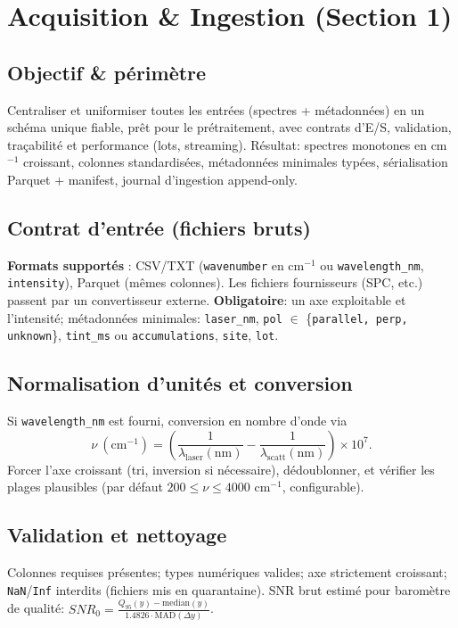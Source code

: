 
\section{Acquisition \& Ingestion (Section 1)}

\subsection{Objectif \& périmètre}
Centraliser et uniformiser toutes les entrées (spectres + métadonnées) en un schéma unique fiable, prêt pour le prétraitement, avec contrats d'E/S, validation, traçabilité et performance (lots, streaming). Résultat: spectres monotones en cm$^{-1}$ croissant, colonnes standardisées, métadonnées minimales typées, sérialisation Parquet + manifest, journal d'ingestion append-only.

\subsection{Contrat d'entrée (fichiers bruts)}
\textbf{Formats supportés} : CSV/TXT (\texttt{wavenumber} en cm$^{-1}$ ou \texttt{wavelength\_nm}, \texttt{intensity}), Parquet (mêmes colonnes). Les fichiers fournisseurs (SPC, etc.) passent par un convertisseur externe.
\textbf{Obligatoire}: un axe exploitable et l'intensité; métadonnées minimales: \texttt{laser\_nm}, \texttt{pol} $\in$ \{\texttt{parallel, perp, unknown}\}, \texttt{tint\_ms} ou \texttt{accumulations}, \texttt{site}, \texttt{lot}.

\subsection{Normalisation d'unités et conversion}
Si \texttt{wavelength\_nm} est fourni, conversion en nombre d'onde via
\begin{equation}
\nu~(\text{cm}^{-1})=\left(\frac{1}{\lambda_{\text{laser}}(\text{nm})}-\frac{1}{\lambda_{\text{scatt}}(\text{nm})}\right)\times 10^7.
\end{equation}
Forcer l'axe croissant (tri, inversion si nécessaire), dédoublonner, et vérifier les plages plausibles (par défaut $200 \le \nu \le 4000$ cm$^{-1}$, configurable).

\subsection{Validation et nettoyage}
Colonnes requises présentes; types numériques valides; axe strictement croissant; \texttt{NaN}/\texttt{Inf} interdits (fichiers mis en quarantaine). SNR brut estimé pour baromètre de qualité: $SNR_0 = \frac{Q_{95}(y)-\mathrm{median}(y)}{1.4826\cdot \mathrm{MAD}(\Delta y)}$.

